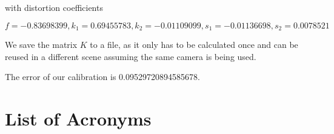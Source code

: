 \documentclass[bibliography=totoc]{scrartcl}
\begin{document}
with distortion coefficients

$f=-0.83698399, k_1=0.69455783, k_2=-0.01109099, s_1=-0.01136698, s_2=0.0078521$

We save the matrix $K$ to a file, as it only has to be calculated once and can be reused in a different scene assuming the same camera is being used.

The error of our calibration is 0.09529720894585678.


\clearpage
\section*{List of Acronyms}



\end{document}
